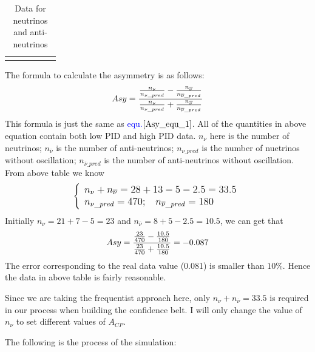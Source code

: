 \documentclass[a4paper,12pt]{article}
\begin{document}
\begin{table}[H]
\begin{tabular}{cccccc}
\multicolumn{1}{l}{}                                                               & \multicolumn{1}{l}{}                                                          & \multicolumn{1}{l}{}                                                               & \multicolumn{1}{l}{}                                                         & \multicolumn{1}{l}{}                                                              & \multicolumn{1}{l}{} \end{tabular}
\caption{Data for neutrinos and anti-neutrinos}
\label{data_table}
\end{table}

The formula to calculate the asymmetry is as follows:
\begin{equation}
    \large
    Asy=\frac{\frac{n_\nu}{n_{\nu\_pred}}-\frac{n_{\overline\nu}}{n_{\overline\nu\_pred}}}{\frac{n_\nu}{n_{\nu\_pred}}+\frac{n_{\overline\nu}}{n_{\overline\nu\_pred}}}
\end{equation}
This formula is just the same as \textcolor{blue}{equ.$\ref{Asy_equ_1}$}.
All of the quantities in above equation contain both low PID and high PID data.
$n_\nu$ here is the number of neutrinos; $n_{\overline\nu}$ is the number of anti-neutrinos; $n_{\nu\_pred}$ is the number of nuetrinos without oscillation; $n_{\overline\nu\_pred}$ is the number of anti-neutrinos without oscillation. From above table we know
\begin{equation}
\large
    \left\{\begin{array}{l}n_\nu+n_{\overline\nu}=28+13-5-2.5=33.5\\n_{\nu\_pred}=470;\;\;\;n_{\overline\nu\_pred}=180\end{array}\right.
\end{equation}
Initially $n_\nu=21+7-5=23$ and $n_{\overline\nu}=8+5-2.5=10.5$, we can get that
\begin{equation}
\large
    Asy=\frac{\frac{23}{470}-\frac{10.5}{180}}{\frac{23}{470}+\frac{10.5}{180}}=-0.087
    \label{asy_cal_1}
\end{equation}
The error corresponding to the real data value (0.081) is smaller than $10\%$. Hence the data in above table is fairly reasonable.

Since we are taking the frequentist approach here, only $n_\nu+n_{\overline\nu}=33.5$ is required in our process when building the confidence belt. I will only change the value of $n_\nu$ to set different values of $A_{CP}$.

The following is the process of the simulation:
\end{document}
